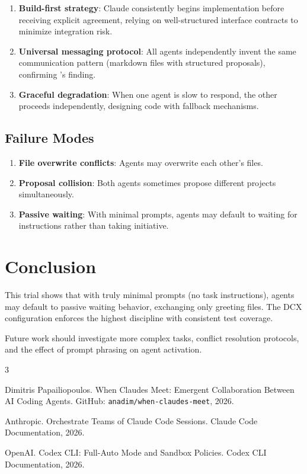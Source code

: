 \documentclass[11pt,a4paper]{article}
\begin{document}
\begin{enumerate}
  \item \textbf{Build-first strategy}: Claude consistently begins implementation before
    receiving explicit agreement, relying on well-structured interface contracts to
    minimize integration risk.
  \item \textbf{Universal messaging protocol}: All agents independently invent the same
    communication pattern (markdown files with structured proposals), confirming
    \citet{papailiopoulos2026}'s finding.
  \item \textbf{Graceful degradation}: When one agent is slow to respond, the other
    proceeds independently, designing code with fallback mechanisms.
\end{enumerate}

\subsection{Failure Modes}

\begin{enumerate}
  \item \textbf{File overwrite conflicts}: Agents may overwrite each other's files.
  \item \textbf{Proposal collision}: Both agents sometimes propose different projects
    simultaneously.
  \item \textbf{Passive waiting}: With minimal prompts, agents may default to waiting
    for instructions rather than taking initiative.
\end{enumerate}

\section{Conclusion}

This trial shows that with truly minimal prompts (no task instructions), agents
may default to passive waiting behavior, exchanging only greeting files. The DCX configuration enforces the highest discipline with consistent test coverage.

Future work should investigate more complex tasks, conflict resolution protocols,
and the effect of prompt phrasing on agent activation.


\begin{thebibliography}{3}

Dimitris Papailiopoulos.
\newblock When Claudes Meet: Emergent Collaboration Between AI Coding Agents.
\newblock GitHub: \texttt{anadim/when-claudes-meet}, 2026.

Anthropic.
\newblock Orchestrate Teams of Claude Code Sessions.
\newblock Claude Code Documentation, 2026.

OpenAI.
\newblock Codex CLI: Full-Auto Mode and Sandbox Policies.
\newblock Codex CLI Documentation, 2026.

\end{thebibliography}
\end{document}
